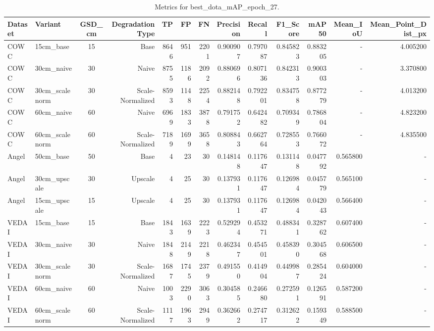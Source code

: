 \begin{table}
\caption{Metrics for best_dota_mAP_epoch_27.}
\label{tab:rq1_results}
\begin{tabular}{llcrrrrrrrrrr}
\toprule
Dataset & Variant & GSD_cm & DegradationType & TP & FP & FN & Precision & Recall & F1_Score & mAP50 & Mean_IoU & Mean_Point_Dist_px \\
\midrule
COWC & 15cm_base & 15 & Base & 8646 & 951 & 2201 & 0.900907 & 0.797087 & 0.845823 & 0.883205 & - & 4.005200 \\
COWC & 30cm_naive & 30 & Naive & 8755 & 1186 & 2092 & 0.880696 & 0.807136 & 0.842313 & 0.900303 & - & 3.370800 \\
COWC & 30cm_scalenorm & 30 & Scale-Normalized & 8593 & 1148 & 2254 & 0.882148 & 0.792201 & 0.834758 & 0.877279 & - & 4.013200 \\
COWC & 60cm_naive & 60 & Naive & 6969 & 1833 & 3878 & 0.791752 & 0.642482 & 0.709349 & 0.786804 & - & 4.823200 \\
COWC & 60cm_scalenorm & 60 & Scale-Normalized & 7189 & 1699 & 3658 & 0.808843 & 0.662764 & 0.728553 & 0.766072 & - & 4.835500 \\
Angel & 50cm_base & 50 & Base & 4 & 23 & 30 & 0.148148 & 0.117647 & 0.131148 & 0.047792 & 0.565800 & - \\
Angel & 30cm_upscale & 30 & Upscale & 4 & 25 & 30 & 0.137931 & 0.117647 & 0.126984 & 0.045779 & 0.565100 & - \\
Angel & 15cm_upscale & 15 & Upscale & 4 & 25 & 30 & 0.137931 & 0.117647 & 0.126984 & 0.042043 & 0.566400 & - \\
VEDAI & 15cm_base & 15 & Base & 1843 & 1639 & 2223 & 0.529294 & 0.453271 & 0.488341 & 0.328762 & 0.607400 & - \\
VEDAI & 30cm_naive & 30 & Naive & 1848 & 2149 & 2218 & 0.462347 & 0.454501 & 0.458390 & 0.304568 & 0.606500 & - \\
VEDAI & 30cm_scalenorm & 30 & Scale-Normalized & 1687 & 1745 & 2379 & 0.491550 & 0.414904 & 0.449987 & 0.285424 & 0.604000 & - \\
VEDAI & 60cm_naive & 60 & Naive & 1003 & 2290 & 3063 & 0.304585 & 0.246680 & 0.272591 & 0.126591 & 0.587200 & - \\
VEDAI & 60cm_scalenorm & 60 & Scale-Normalized & 1117 & 1963 & 2949 & 0.362662 & 0.274717 & 0.312622 & 0.159349 & 0.588500 & - \\
\bottomrule
\end{tabular}
\end{table}
